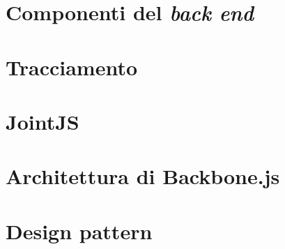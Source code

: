 \section{Componenti del \emph{back end}} \label{sec:backend}


% 

\section{Tracciamento}




\appendix

\section{JointJS} \label{sec:app_jointjs}


\section{Architettura di Backbone.js}


\section{Design pattern} \label{sec:app_creaz}



